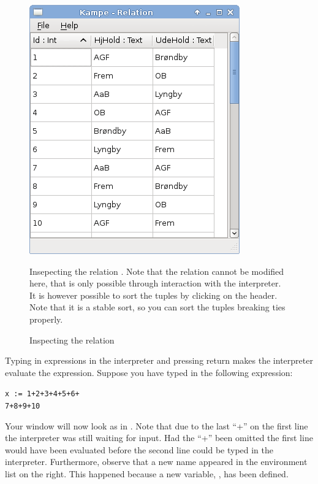 \documentclass[a4,14pt,latin1]{article}
\begin{document}
\begin{figure}
  \centerline{\includegraphics[scale=0.5]{relation_view.png}}
  \caption{Inspecting the relation }{Insepecting the relation . Note that the
    relation cannot be modified here, that is only possible through
    interaction with the \RAS{} interpreter. It is however possible to
    sort the tuples by clicking on the header. Note that it is a
    stable sort, so you can sort the tuples breaking ties properly.}
  \label{fig:relation_view}
\end{figure}

Typing in expressions in the interpreter and pressing return makes the
interpreter evaluate the expression. Suppose you have typed in the
following expression:

\begin{center}
{\tt x := 1+2+3+4+5+6+\\
7+8+9+10}
\end{center}

Your \RAS{} window will now look as in . Note
that due to the last ``+'' on the first line the interpreter was still
waiting for input. Had the ``+'' been omitted the first line would
have been evaluated before the second line could be typed in the
interpreter. Furthermore, observe that a new name appeared in the
environment list on the right. This happened because a new variable,
, has been defined.
\end{document}
